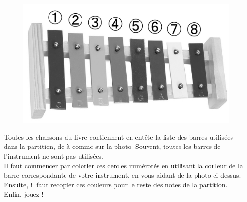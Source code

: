 \documentclass[17pt,letterpaper]{extarticle}
\makeatletter
\newcommand*\circled[1]{\tikz[baseline=(char.base)]{
            \node[shape=circle,draw,inner sep=2pt] (char) {#1};}}
\def\clearleftpage{\clearpage\ifodd\c@page\else
\hbox{}\newpage\if@twocolumn\hbox{}\newpage\fi\fi}
\makeatother
\begin{document}
\begin{figure}[h]
\includegraphics[width=\textwidth]{xylophone_bw.png}
\end{figure}

Toutes les chansons du livre contiennent en entête la liste des barres utilisées dans la partition, de \circled{1} à \circled{8} comme sur la photo. Souvent, toutes les barres de l'instrument ne sont pas utilisées.\\

Il faut commencer par colorier ces cercles numérotés en utilisant la couleur de la barre correspondante de votre instrument, en vous aidant de la photo ci-dessus. Ensuite, il faut recopier ces couleurs pour le reste des notes de la partition.\\

Enfin, jouez !

\clearleftpage



\clearleftpage



\clearleftpage



\clearleftpage



\clearleftpage



\clearleftpage



\clearleftpage


\end{document}
